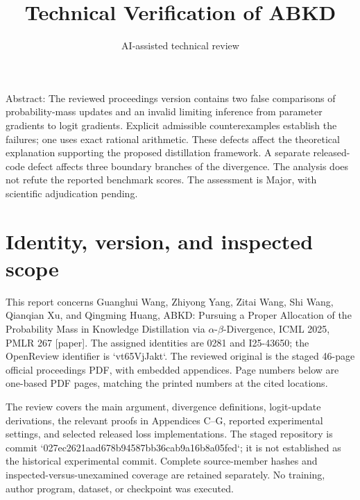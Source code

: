 \documentclass[10pt]{article}
\title{Technical Verification of ABKD}
\author{AI-assisted technical review}
\date{}
\begin{document}
\maketitle
Abstract: The reviewed proceedings version contains two false comparisons of probability-mass updates and an invalid limiting inference from parameter gradients to logit gradients. Explicit admissible counterexamples establish the failures; one uses exact rational arithmetic. These defects affect the theoretical explanation supporting the proposed distillation framework. A separate released-code defect affects three boundary branches of the divergence. The analysis does not refute the reported benchmark scores. The assessment is Major, with scientific adjudication pending.\par
\section*{Identity, version, and inspected scope}
This report concerns Guanghui Wang, Zhiyong Yang, Zitai Wang, Shi Wang, Qianqian Xu, and Qingming Huang, ABKD: Pursuing a Proper Allocation of the Probability Mass in Knowledge Distillation via \(\alpha\)-\(\beta\)-Divergence, ICML 2025, PMLR 267 [paper]. The assigned identities are 0281 and I25-43650; the OpenReview identifier is `vt65VjJakt`. The reviewed original is the staged 46-page official proceedings PDF, with embedded appendices. Page numbers below are one-based PDF pages, matching the printed numbers at the cited locations.\par
The review covers the main argument, divergence definitions, logit-update derivations, the relevant proofs in Appendices C–G, reported experimental settings, and selected released loss implementations. The staged repository is commit `027ec2621aad678b94587bb36cab9a16b8a05fed`; it is not established as the historical experimental commit. Complete source-member hashes and inspected-versus-unexamined coverage are retained separately. No training, author program, dataset, or checkpoint was executed.\par
\end{document}
